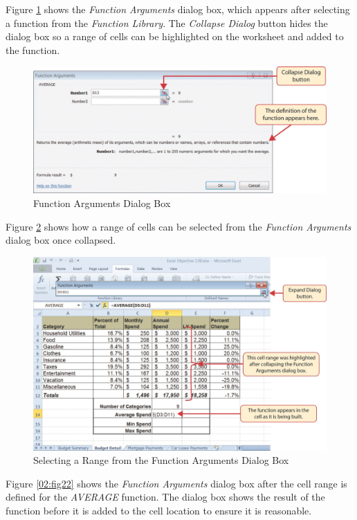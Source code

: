 Figure \ref{02:fig20} shows the \textit{Function Arguments} dialog box, which appears after selecting a function from the \textit{Function Library}. The \textit{Collapse Dialog} button hides the dialog box so a range of cells can be highlighted on the worksheet and added to the function.

\begin{figure}[H]
	\centering
	\includegraphics[width=\maxwidth{.95\linewidth}]{gfx/ch02_fig20}
	\caption{Function Arguments Dialog Box}
	\label{02:fig20}
\end{figure}

Figure \ref{02:fig21} shows how a range of cells can be selected from the \textit{Function Arguments} dialog box once collapsed.

\begin{figure}[H]
	\centering
	\includegraphics[width=\maxwidth{.95\linewidth}]{gfx/ch02_fig21}
	\caption{Selecting a Range from the Function Arguments Dialog Box}
	\label{02:fig21}
\end{figure}

Figure \ref{02:fig22} shows the \textit{Function Arguments} dialog box after the cell range is defined for the \textit{AVERAGE} function. The dialog box shows the result of the function before it is added to the cell location to ensure it is reasonable.


